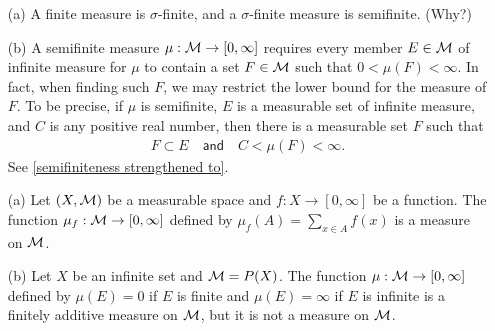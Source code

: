 \begin{rmk}
    \begin{enumerate}
        \item[(a)]
        {
            A finite measure is $\sigma$-finite, and a $\sigma$-finite measure is semifinite. \color{brown}(Why?)\color{black}
        }
        \item[(b)]
        {
            A semifinite measure $\mu: {\mathcal{M}}\rightarrow[0, \infty]$ requires every member $E\in{\mathcal{M}}$ of infinite measure for $\mu$ to contain a set $F\in{\mathcal{M}}$ such that $0<\mu(F)<\infty$.
            In fact, when finding such $F$, we may restrict the lower bound for the measure of $F$.
            To be precise, if $\mu$ is semifinite, $E$ is a measurable set of infinite measure, and $C$ is any positive real number, then there is a measurable set $F$ such that
            \begin{align*}
                F\subset E\quad\textsf{and}\quad C<\mu(F)<\infty.
            \end{align*}
            See \cref{semifiniteness strengthened to}.
        }
    \end{enumerate}
\end{rmk}

\begin{exmp}
    \begin{enumerate}
        \item[(a)]
        {
            Let $(X, {\mathcal{M}})$ be a measurable space and $f: X\rightarrow [0, \infty]$ be a function.
            The function $\mu_f: {\mathcal{M}}\rightarrow[0, \infty]$ defined by $\mu_f(A)=\sum_{x\in A} f(x)$ is a measure on ${\mathcal{M}}$.
        }
        \item[(b)]
        {
            Let $X$ be an infinite set and ${\mathcal{M}}=P(X)$.
            The function $\mu: {\mathcal{M}}\rightarrow[0, \infty]$ defined by $\mu(E)=0$ if $E$ is finite and $\mu(E)=\infty$ if $E$ is infinite is a finitely additive measure on ${\mathcal{M}}$, but it is not a measure on ${\mathcal{M}}$.
        }
    \end{enumerate}
\end{exmp}

